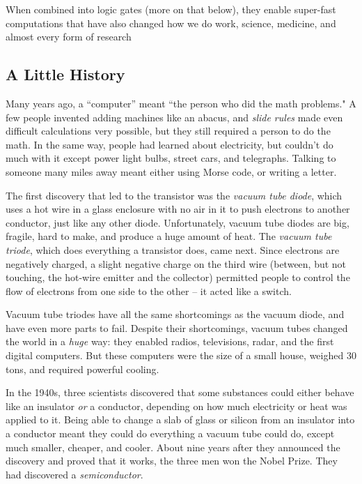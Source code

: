 \+ When combined into logic gates (more on that below), they enable super-fast computations that have also changed how we do work, science, medicine, and almost every form of research

\ei

\subsection*{A Little History}

Many years ago, a ``computer'' meant ``the person who did the math problems." A few people invented adding machines like an abacus, and \emph{slide rules} made even difficult calculations very possible, but they still required a person to do the math. In the same way, people had learned about electricity, but couldn't do much with it except power light bulbs, street cars, and telegraphs. Talking to someone many miles away meant either using Morse code, or writing a letter. 

The first discovery that led to the transistor was the \emph{vacuum tube diode}, which uses a hot wire in a glass enclosure with no air in it to push electrons to another conductor, just like any other diode. Unfortunately, vacuum tube diodes are big, fragile, hard to make, and produce a huge amount of heat. The \emph{vacuum tube triode}, which does everything a transistor does, came next. Since electrons are negatively charged, a slight negative charge on the third wire (between, but not touching, the hot-wire emitter and the collector) permitted people to control the flow of electrons from one side to the other -- it acted like a switch. 

Vacuum tube triodes have all the same shortcomings as the vacuum diode, and have even more parts to fail. Despite their shortcomings, vacuum tubes changed the world in a \emph{huge} way: they enabled radios, televisions, radar, and the first digital computers. But these computers were the size of a small house, weighed 30 tons, and required powerful cooling.

In the 1940s, three scientists discovered that some substances could either behave like an insulator \emph{or} a conductor, depending on how much electricity or heat was applied to it. Being able to change a slab of glass or silicon from an insulator into a conductor meant they could do everything a vacuum tube could do, except much smaller, cheaper, and cooler. About nine years after they announced the discovery and proved that it works, the three men won the Nobel Prize. They had discovered a \emph{semiconductor}. 

